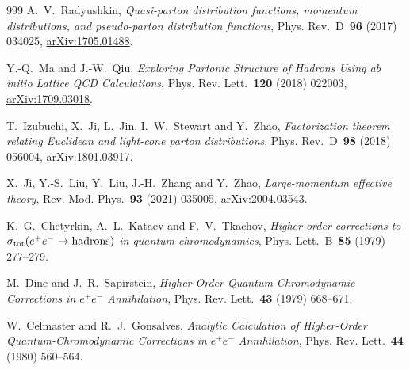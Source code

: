 \begin{thebibliography}{999}
A.~V.~Radyushkin, \emph{Quasi-parton distribution functions, momentum distributions, and pseudo-parton distribution functions}, Phys. Rev.~D~\textbf{96} (2017) \mbox{034025}, \href{https://arxiv.org/abs/1705.01488}{arXiv:1705.01488}.

Y.-Q.~Ma and J.-W.~Qiu, \emph{Exploring Partonic Structure of Hadrons Using \emph{ab initio} Lattice QCD Calculations}, Phys. Rev. Lett.~\textbf{120} (2018) \mbox{022003}, \href{https://arxiv.org/abs/1709.03018}{arXiv:1709.03018}.

T.~Izubuchi, X.~Ji, L.~Jin, I.~W.~Stewart and Y.~Zhao, \emph{Factorization theorem relating Euclidean and light-cone parton distributions}, Phys. Rev.~D~\textbf{98} (2018) \mbox{056004}, \href{https://arxiv.org/abs/1801.03917}{arXiv:1801.03917}.

X.~Ji, Y.-S.~Liu, Y.~Liu, J.-H.~Zhang and Y.~Zhao, \emph{Large-momentum effective theory}, Rev. Mod. Phys.~\textbf{93} (2021) \mbox{035005}, \href{https://arxiv.org/abs/2004.03543}{arXiv:2004.03543}.



K.~G.~Chetyrkin, A.~L.~Kataev and F.~V.~Tkachov, \emph{Higher-order corrections to $\sigma_{\rm tot}(e^+e^-\to\text{hadrons})$ in quantum chromodynamics}, Phys. Lett.~B~\textbf{85} (1979) \mbox{277--279}.

M.~Dine and J.~R.~Sapirstein, \emph{Higher-Order Quantum Chromodynamic Corrections in $e^+e^-$ Annihilation}, Phys. Rev. Lett.~\textbf{43} (1979) \mbox{668--671}.

W.~Celmaster and R.~J.~Gonsalves, \emph{Analytic Calculation of Higher-Order Quantum-Chromodynamic Corrections in $e^+e^-$ Annihilation}, Phys. Rev. Lett.~\textbf{44} (1980) \mbox{560--564}.


\end{thebibliography}
